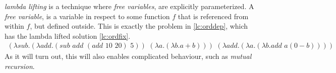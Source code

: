 \documentclass[11pt,oneside,a4paper]{report}
\begin{document}
\textit{lambda lifting} is a technique where \textit{free variables}, are explicitly parameterized.
A \textit{free variable}, is a variable in respect to some function $f$ that is referenced from within $f$, but defined outside. 
This is exactly the problem in \autoref{lc:orddep}, which has the lambda lifted solution \autoref{lc:ordfix}.
\begin{align}
(\lambda sub . (\lambda add . (sub \,\, add \,\, (add \,\, 10 \,\, 20) \,\, 5)) \,\, (\lambda a . (\lambda b . a + b))) \,\, (\lambda add .(\lambda a . (\lambda b . add \,\, a (0 - b))))
\label{lc:ordfix}
\end{align}
As it will turn out, this will also enables complicated behaviour, such as \textit{mutual recursion}.
\end{document}
